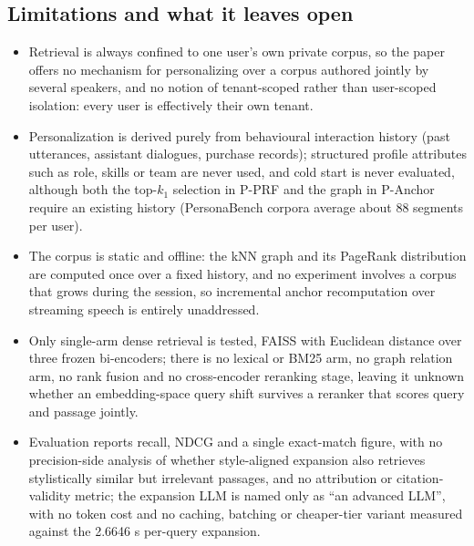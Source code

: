 \subsection{Limitations and what it leaves open}
\begin{itemize}[leftmargin=*,nosep]
  \item Retrieval is always confined to one user's own private corpus, so the paper offers no mechanism for personalizing over a corpus authored jointly by several speakers, and no notion of tenant-scoped rather than user-scoped isolation: every user is effectively their own tenant.
  \item Personalization is derived purely from behavioural interaction history (past utterances, assistant dialogues, purchase records); structured profile attributes such as role, skills or team are never used, and cold start is never evaluated, although both the top-$k_1$ selection in P-PRF and the graph in P-Anchor require an existing history (PersonaBench corpora average about 88 segments per user).
  \item The corpus is static and offline: the kNN graph and its PageRank distribution are computed once over a fixed history, and no experiment involves a corpus that grows during the session, so incremental anchor recomputation over streaming speech is entirely unaddressed.
  \item Only single-arm dense retrieval is tested, FAISS with Euclidean distance over three frozen bi-encoders; there is no lexical or BM25 arm, no graph relation arm, no rank fusion and no cross-encoder reranking stage, leaving it unknown whether an embedding-space query shift survives a reranker that scores query and passage jointly.
  \item Evaluation reports recall, NDCG and a single exact-match figure, with no precision-side analysis of whether style-aligned expansion also retrieves stylistically similar but irrelevant passages, and no attribution or citation-validity metric; the expansion LLM is named only as ``an advanced LLM'', with no token cost and no caching, batching or cheaper-tier variant measured against the 2.6646 s per-query expansion.
\end{itemize}
